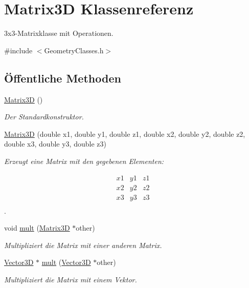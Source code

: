 \hypertarget{classMatrix3D}{\section{Matrix3\-D Klassenreferenz}
\label{classMatrix3D}
}


3x3-\/\-Matrixklasse mit Operationen.  




{\ttfamily \#include $<$Geometry\-Classes.\-h$>$}

\subsection*{Öffentliche Methoden}
\begin{DoxyCompactItemize}
\item 
\hyperlink{classMatrix3D_afe9c6b7abe858fe9f6aea8f0607a00a7}{Matrix3\-D} ()
\begin{DoxyCompactList}\small\item\em Der Standardkonstruktor. \end{DoxyCompactList}\item 
\hyperlink{classMatrix3D_abd8f512d6fdfda45bfe655ae38cde303}{Matrix3\-D} (double x1, double y1, double z1, double x2, double y2, double z2, double x3, double y3, double z3)
\begin{DoxyCompactList}\small\item\em Erzeugt eine Matrix mit den gegebenen Elementen\-:\par
 \begin{eqnarray*} x1 & y1 & z1 \\ x2 & y2 & z2 \\ x3 & y3 & z3 \\ \end{eqnarray*}. \end{DoxyCompactList}\item 
void \hyperlink{classMatrix3D_a399be81028219044a03439b2ff93782a}{mult} (\hyperlink{classMatrix3D}{Matrix3\-D} $\ast$other)
\begin{DoxyCompactList}\small\item\em Multipliziert die Matrix mit einer anderen Matrix. \end{DoxyCompactList}\item 
\hyperlink{classVector3D}{Vector3\-D} $\ast$ \hyperlink{classMatrix3D_adb30531e4dd89eb99ed2fb7f94269122}{mult} (\hyperlink{classVector3D}{Vector3\-D} $\ast$other)
\begin{DoxyCompactList}\small\item\em Multipliziert die Matrix mit einem Vektor. \end{DoxyCompactList}\item 

\end{DoxyCompactItemize}
